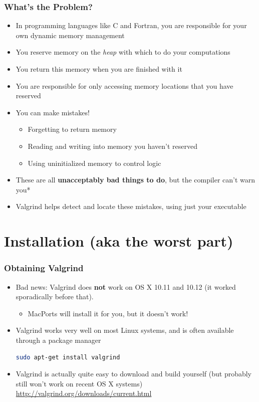 \documentclass{beamer}
\begin{document}
\begin{frame}[fragile]
\frametitle{What's the Problem?}
\begin{itemize}
\item In programming languages like C and Fortran, you are responsible for your own dynamic memory management
\item You reserve memory on the \emph{heap} with which to do your computations
\item You return this memory when you are finished with it
\item You are responsible for only accessing memory locations that you have reserved
\item You can make mistakes!
\begin{itemize}
\item Forgetting to return memory
\item Reading and writing into memory you haven't reserved
\item Using uninitialized memory to control logic
\end{itemize}
\item These are all {\bf unacceptably bad things to do}, but the compiler can't warn you*
\item Valgrind helps detect and locate these mistakes, using just your executable
\end{itemize}
\end{frame}

\section{Installation (aka the worst part)}

\begin{frame}[fragile]
\frametitle{Obtaining Valgrind}
\begin{itemize}
  \item Bad news: Valgrind does {\bf not} work on OS X 10.11 and 10.12 (it worked sporadically before that).
    \begin{itemize}
      \item MacPorts will install it for you, but it doesn't work!
    \end{itemize}
\item Valgrind works very well on most Linux systems, and is often available through a package manager
\begin{lstlisting}[language=bash]
sudo apt-get install valgrind
\end{lstlisting}
\item Valgrind is actually quite easy to download and build yourself (but probably still won't work on recent OS X systems) \\
  \url{http://valgrind.org/downloads/current.html}
\end{itemize}
\end{frame}
\end{document}
